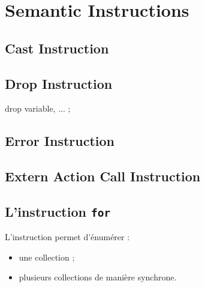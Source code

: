 
\chapter{Semantic Instructions}







\section{Cast Instruction}








\section{Drop Instruction}

{
\begin{galgascode}
drop variable, ... ;
\end{galgascode}
}

\section{Error Instruction}


\section{Extern Action Call Instruction}




\section{L'instruction \texttt{for}}






L'instruction  permet d'énumérer :
\begin{itemize}
  \item une collection ;
  \item plusieurs collections de manière synchrone.
\end{itemize}

